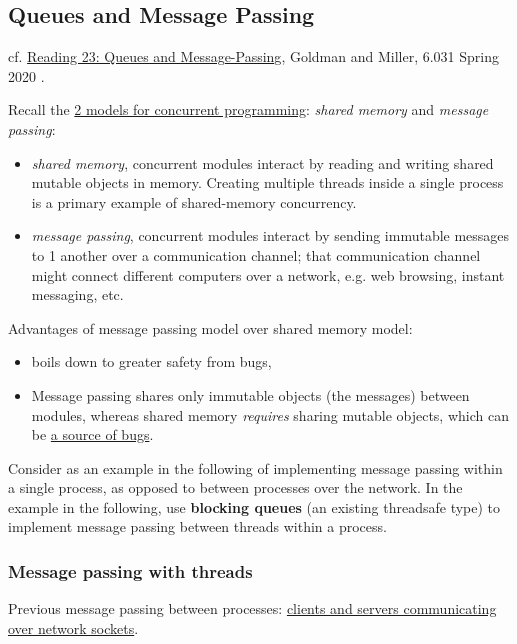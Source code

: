 \documentclass[10pt]{amsart}
\begin{document}
\subsection{Queues and Message Passing}

cf. \href{http://web.mit.edu/6.031/www/sp20/classes/23-queues/}{Reading 23: Queues and Message-Passing}, Goldman and Miller, 6.031 Spring 2020 \cite{6dot005and6dot031}. 

Recall the \href{http://web.mit.edu/6.031/www/sp20/classes/20-concurrency/#two_models_for_concurrent_programming}{2 models for concurrent programming}: \emph{shared memory} and \emph{message passing}:
\begin{itemize}
	\item \emph{shared memory}, concurrent modules interact by reading and writing shared mutable objects in memory. Creating multiple threads inside a single process is a primary example of shared-memory concurrency.
	\item \emph{message passing}, concurrent modules interact by sending immutable messages to 1 another over a communication channel; that communication channel might connect different computers over a network, e.g. web browsing, instant messaging, etc.
\end{itemize}

Advantages of message passing model over shared memory model:
\begin{itemize}
	\item boils down to greater safety from bugs,
	\item Message passing shares only immutable objects (the messages) between modules, whereas shared memory \emph{requires} sharing mutable objects, which can be \href{http://web.mit.edu/6.031/www/sp20/classes/08-immutability/#risks_of_mutation}{a source of bugs}.
\end{itemize}

Consider as an example in the following of implementing message passing within a single process, as opposed to between processes over the network. In the example in the following, use \textbf{blocking queues} (an existing threadsafe type) to implement message passing between threads within a process.

\subsubsection{Message passing with threads}

Previous message passing between processes: \href{http://web.mit.edu/6.005/www/fa15/classes/21-sockets-networking/#network_sockets}{clients and servers communicating over network sockets}. 
\end{document}

